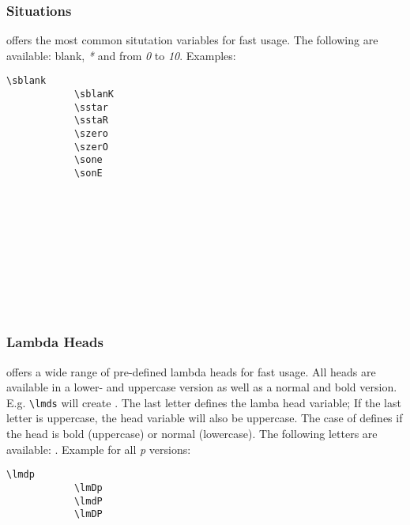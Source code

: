 \documentclass[10pt, a4paper]{article}
\begin{document}
	\subsubsection{Situations}
	\texttt{} offers the most common situtation variables for fast usage. The following are available: blank, \textit{*} and from \textit{0} to \textit{10}. Examples:
	\begin{center}
		\begin{minipage}[h][3.2cm][t]{15em}
			\begin{lstlisting}[style=B]
			\sblank
			\sblanK
			\sstar
			\sstaR
			\szero
			\szerO
			\sone
			\sonE
			\end{lstlisting}
		\end{minipage}
		\begin{minipage}[h][3.2cm][t]{15em}
			\ \\
			\sblank\\
			\sblanK\\
			\sstar\\
			\sstaR\\
			\szero\\
			\szerO\\
			\sone\\
			\sonE
		\end{minipage}
	\end{center}
	\subsubsection{Lambda Heads}
	\texttt{} offers a wide range of pre-defined lambda heads for fast usage. All heads are available in a lower- and uppercase version as well as a normal and bold version. E.g. \verb=\lmds= will create \zit{\lmds}. The last letter defines the lamba head variable; If the last letter is uppercase, the head variable will also be uppercase. The case of  defines if the head is bold (uppercase) or normal (lowercase). The following letters are available: . Example for all \textit{p} versions:
	\begin{center}
		\begin{minipage}[h][1.6cm][t]{15em}
			\begin{lstlisting}[style=B]
			\lmdp
			\lmDp
			\lmdP
			\lmDP
			\end{lstlisting}
		\end{minipage}
		\begin{minipage}[h][1.6cm][t]{15em}
			\ \\\lmdp\\
			\lmDp\\
			\lmdP\\
			\lmDP
		\end{minipage}
	\end{center}
\end{document}
